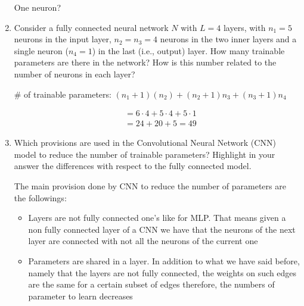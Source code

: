 \documentclass[a4paper,11pt,oneside]{book}
\begin{document}
\begin{enumerate}
\begin{solution}
        One neuron?
    \end{solution}
\clearpage
\item Consider a fully connected neural network $N$ with $L = 4$ layers, with $n_1 = 5$ neurons in the input layer, $n_2 = n_3 = 4$ neurons in the two inner layers and a single neuron ($n_4 = 1$) in the last (i.e., output) layer. How many trainable parameters are there in the network? How is this number related to the number of neurons in each layer?
    \begin{solution}
        \# of trainable parameters: $\left(n_1 + 1\right)\left(n_2\right) + \left(n_2 + 1\right)n_3 + \left(n_3 + 1\right)n_4$

        \begin{align*}
        &= 6 \cdot 4 + 5 \cdot 4 + 5 \cdot 1 \\
        &= 24 + 20 + 5 = 49
        \end{align*}
    \end{solution}

\item Which provisions are used in the Convolutional Neural Network (CNN) model to reduce the number of trainable parameters? Highlight in your answer the differences with respect to the fully connected model.
    \begin{solution}        
        The main provision done by CNN to reduce the number of parameters are the followings:
        
        \begin{itemize}
        \item Layers are not fully connected one's like for MLP. That means given a non fully connected layer of a CNN we have that the neurons of the next layer are connected with not all the neurons of the current one
        
        \item Parameters are shared in a layer. In addition to what we have said before, namely that the layers are not fully connected, the weights on such edges are the same for a certain subset of edges therefore, the numbers of parameter to learn decreases
        \end{itemize}
    \end{solution}
\end{enumerate}

\clearpage
\end{document}
